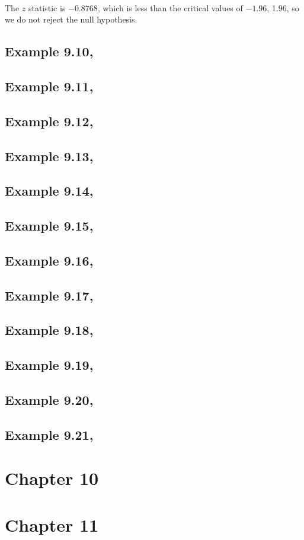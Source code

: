 \documentclass{article}\usepackage[]{graphicx}\usepackage[]{color}
\begin{document}
\paragraph{}The $z$ statistic is \ensuremath{-0.8768}, which is less than the critical values of \ensuremath{-1.96}, 1.96, so we do not reject the null hypothesis.

\subsection{Example 9.10, }
\subsection{Example 9.11, }
\subsection{Example 9.12, }
\subsection{Example 9.13, }
\subsection{Example 9.14, }
\subsection{Example 9.15, }
\subsection{Example 9.16, }
\subsection{Example 9.17, }
\subsection{Example 9.18, }
\subsection{Example 9.19, }
\subsection{Example 9.20, }
\subsection{Example 9.21, }

\section{Chapter 10}


\section{Chapter 11}
\end{document}
